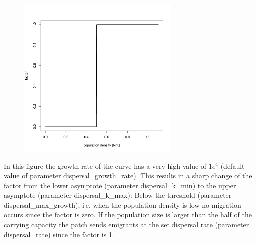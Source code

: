\documentclass[letterpaper,12pt,oneside]{book}
\begin{document}
\begin{figure}[h]
	\centering
		\includegraphics[width=0.70\textwidth]{dispersal-factor.pdf}
	\label{fig:dispersal-factor}
\end{figure}

In this figure the growth rate of the curve has a very high value of $1e^{4}$ (default value of parameter \textsf{dispersal\_growth\_rate}). This results in a sharp change of the factor from the lower asymptote (parameter \textsf{dispersal\_k\_min}) to the upper asymptote (parameter \textsf{dispersal\_k\_max}): Below the threshold (parameter \textsf{dispersal\_max\_growth}), i.e. when the population density is low no migration occurs since the factor is zero. If the population size is larger than the half of the carrying capacity the patch sends emigrants at the set dispersal rate (parameter \textsf{dispersal\_rate}) since the factor is 1.    
\end{document}
